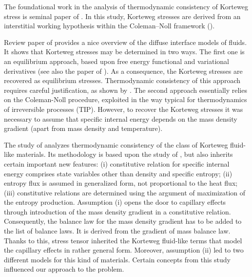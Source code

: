 \documentclass[a4paper,fleqn]{cas-sc}
\theoremstyle{definition}
\begin{document}
The foundational work in the analysis of thermodynamic consistency of Korteweg stress is seminal paper of \cite{dunn1985interstitial}. In this study, Korteweg stresses are derived from an interstitial working hypothesis within the Coleman--Noll framework (\cite{coleman1974thermodynamics}). 

Review paper of \cite{anderson1998diffuse} provides a nice overview of the diffuse interface models of fluids. It shows that Korteweg stresses may be determined in two ways. The first one is an equilibrium approach, based upon free energy functional and variational derivatives (see also the paper of \cite{lowengrub1998quasi}). As a consequence, the Korteweg stresses are recovered as equilibrium stresses. Thermodynamic consistency of this approach requires careful justification, as shown by \cite{heida2012cahn}. The second approach essentially relies on the Coleman-Noll procedure, exploited in the way typical for thermodynamics of irreversible processes (TIP). However, to recover the Korteweg stresses it was necessary to assume that specific internal energy depends on the mass density gradient (apart from mass density and temperature). 

The study of \cite{heida2010compressible} analyzes thermodynamic consistency of the class of Korteweg fluid-like materials. Its methodology is based upon the study of \cite{rajagopal2004thermomechanical}, but also inherits certain important new features: (i) constitutive relation for specific internal energy comprises state variables other than density and specific entropy; (ii) entropy flux is assumed in generalized form, not proportional to the heat flux; (iii) constitutive relations are determined using the argument of maximization of the entropy production. Assumption (i) opens the door to capillary effects through introduction of the mass density gradient in a constitutive relation. Consequently,  the balance law for the mass density gradient has to be added to the list of balance laws. It is derived from the gradient of mass balance law. Thanks to this, stress tensor inherited the Korteweg fluid-like terms that model the capillary effects in rather general form. Moreover, assumption (ii) led to two different models for this kind of materials. Certain concepts from this study influenced our approach to the problem. 
\end{document}
